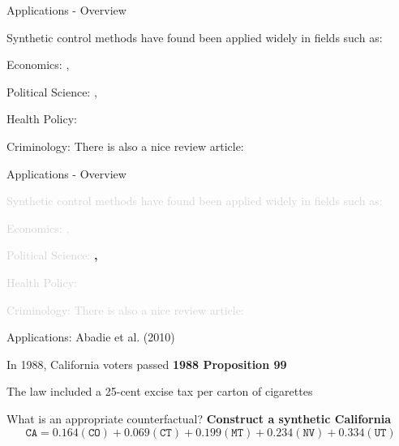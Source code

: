 \documentclass[notes,11pt, aspectratio=169]{beamer}
\newenvironment{wideitemize}{\itemize\addtolength{\itemsep}{10pt}}{\enditemize}
\begin{document}
\begin{frame}{Applications - Overview}

    Synthetic control methods have found been applied widely
    in fields such as: \\ \medskip
    \begin{wideitemize}
        \item Economics: \cite{gautier_terrorism_2009} \cite{billmeier_assessing_2013}, \cite{cavallo_catastrophic_2013}
        \item Political Science: \cite{abadie_synthetic_2010}, \cite{abadie_comparative_2015}
        \item Health Policy: \cite{kreif_examination_2016} \cite{li_removing_2021}
        \item Criminology: \cite{saunders_synthetic_2015}
    \end{wideitemize}
    \medskip
    There is also a nice review article: \cite{abadie_using_2021} 
\end{frame}

\begin{frame}{Applications - Overview}

    \textcolor{lightgray}{Synthetic control methods have found been applied widely
    in fields such as:} \\ \medskip
    \begin{wideitemize}
        \item \textcolor{lightgray}{Economics: \cite{gautier_terrorism_2009} \cite{billmeier_assessing_2013}, \cite{cavallo_catastrophic_2013}}
        \item \textcolor{lightgray}{Political Science:}\textbf{ \cite{abadie_synthetic_2010},} \textcolor{lightgray}{\cite{abadie_comparative_2015}}
        \item \textcolor{lightgray}{Health Policy: \cite{kreif_examination_2016} \cite{li_removing_2021}}
        \item \textcolor{lightgray}{Criminology: \cite{saunders_synthetic_2015}}
    \end{wideitemize}
    \medskip
    \textcolor{lightgray}{There is also a nice review article: \cite{abadie_using_2021} }
\end{frame}

\begin{frame}{Applications: Abadie et al. (2010)}

    \begin{wideitemize}
        \item In 1988, California voters passed \textbf{1988 Proposition 99}
        \item The law included a 25-cent excise tax per carton of cigarettes
        \item What is an appropriate counterfactual? \pause \textbf{Construct a synthetic California} \pause 
    \end{wideitemize}
    \medskip \medskip \medskip \medskip
    \[\texttt{CA} = 0.164 (\texttt{CO}) + 0.069 (\texttt{CT}) + 0.199 (\texttt{MT}) + 0.234 (\texttt{NV}) + 0.334 (\texttt{UT})\]
\end{frame}
\end{document}
